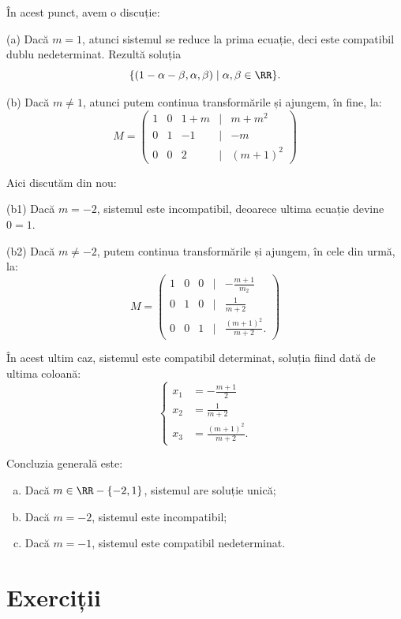 În acest punct, avem o discuție:

(a) Dacă $m = 1$, atunci sistemul se reduce la prima ecuație, deci este compatibil
dublu nedeterminat. Rezultă soluția
\[
  \{ (1 - \alpha - \beta, \alpha, \beta) \mid \alpha, \beta \in \RR \}.
\]

(b) Dacă $m \neq 1$, atunci putem continua transformările și ajungem, în fine, la:
\[
  M = \begin{pmatrix}
    1 & 0 & 1 + m & \mid & m + m^2 \\
    0 & 1 & -1 & \mid & -m \\
    0 & 0 & 2 & \mid & (m + 1)^2
  \end{pmatrix}
\]

Aici discutăm din nou:

(b1) Dacă $m = -2$, sistemul este incompatibil, deoarece ultima ecuație devine $0 = 1$.

(b2) Dacă $m \neq -2$, putem continua transformările și ajungem, în cele din urmă, la:
\[
  M = \begin{pmatrix}
    1 & 0 & 0 & \mid & - \frac{m+1}{m_2}  \\
    0 & 1 & 0 & \mid & \frac{1}{m+2} \\
    0 & 0 & 1 & \mid & \frac{(m + 1)^2}{m + 2}.
  \end{pmatrix}
\]

În acest ultim caz, sistemul este compatibil determinat, soluția fiind dată de ultima coloană:
\[
  \begin{cases}
    x_1  &= -\frac{m + 1}{2} \\
    x_2  &= \frac{1}{m + 2} \\
    x_3  &= \frac{(m + 1)^2}{m + 2}.
  \end{cases}
\]

Concluzia generală este:
\begin{enumerate}[(a)]
  \item Dacă $m \in \RR - \{-2, 1\}$, sistemul are soluție unică;
  \item Dacă $m = -2$, sistemul este incompatibil;
  \item Dacă $m = -1$, sistemul este compatibil nedeterminat.
\end{enumerate}


\section{Exerciții}


